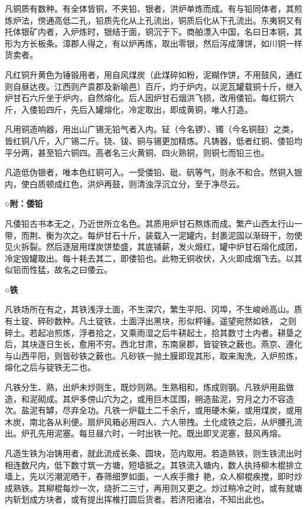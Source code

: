 \documentclass[]{article}
\begin{document}
凡铜质有数种。有全体皆铜，不夹铅、银者，洪炉单炼而成。有与铅同体者，其煎炼炉法，傍通高低二孔，铅质先化从上孔流出，铜质后化从下孔流出。东夷铜又有托体银矿内者，入炉炼时，银结于面，铜沉于下。商舶漂入中国，名曰日本铜，其形为方长板条。漳郡人得之，有以炉再炼，取出零银，然后泻成薄饼，如川铜一样货卖者。

凡红铜升黄色为锤锻用者，用自风煤炭（此煤碎如粉，泥糊作饼，不用鼓风，通红则自昼达夜。江西则产袁郡及新喻邑）百斤，灼于炉内，以泥瓦罐载铜十斤，继入炉甘石六斤坐于炉内，自然熔化。后人因炉甘石烟洪飞损，改用倭铅。每红铜六斤，入倭铅四斤，先后入罐熔化，冷定取出，即成黄铜，唯人打造。

凡用铜造响器，用出山广锡无铅气者入内。钲（今名锣）、镯（今名铜鼓）之类，皆红铜八斤，入广锡二斤。铙、钹、铜与锡更加精炼。凡铸器，低者红铜、倭铅均平分两，甚至铅六铜四。高者名三火黄铜、四火熟铜，则铜七而铅三也。

凡造低伪银者，唯本色红铜可入。一受倭铅、砒、矾等气，则永不和合。然铜入银内，使白质顿成红色，洪炉再鼓，则清浊浮沉立分，至于净尽云。

\textbf{○附：倭铅}

凡倭铅古书本无之，乃近世所立名色。其质用炉甘石熬炼而成。繁产山西太行山一带，而荆、衡为次之。每炉甘石十斤，装载入一泥罐内，封裹泥固以渐砑干，勿使见火拆裂。然后逐层用煤炭饼垫盛，其底铺薪，发火煅红，罐中炉甘石熔化成团，冷定毁罐取出。每十耗去其二，即倭铅也。此物无铜收伏，入火即成烟飞去。以其似铅而性猛，故名之曰倭云。

\textbf{○铁}

凡铁场所在有之，其铁浅浮土面，不生深穴，繁生平阳、冈埠，不生峻岭高山。质有土锭、碎砂数种。凡土锭铁，土面浮出黑块，形似枰锤。遥望宛然如铁，之则碎土。若起冶煎炼，浮者拾之，又乘雨湿之后牛耕起土，拾其数寸土内者。耕垦之后，其块逐日生长，愈用不穷。西北甘肃，东南泉郡，皆锭铁之薮也。燕京、遵化与山西平阳，则皆砂铁之薮也。凡砂铁一抛土膜即现其形，取来淘洗，入炉煎炼，熔化之后与锭铁无二也。

凡铁分生、熟，出炉未炒则生，既炒则熟。生熟相和，炼成则钢。凡铁炉用盐做造，和泥砌成。其炉多傍山穴为之，或用巨木匡围，朔造盐泥，穷月之力不容造次。盐泥有罅，尽弃全功。凡铁一炉载土二千余斤，或用硬木柴，或用煤炭，或用木炭，南北各从利便。扇炉风箱必用四人、六人带拽。土化成铁之后，从炉腰孔流出。炉孔先用泥塞。每旦昼六时，一时出铁一陀。既出即叉泥塞，鼓风再熔。

凡造生铁为冶铸用者，就此流成长条、圆块，范内取用。若造熟铁，则生铁流出时相连数尺内，低下数寸筑一方塘，短墙抵之。其铁流入塘内，数人执持柳木棍排立墙上，先以污潮泥晒干，舂筛细罗如面，一人疾手撒扌艳，众人柳棍疾搅，即时炒成熟铁。其柳棍每炒一次，烧折二三寸，再用则又更之。炒过稍冷之时，或有就塘内斩划成方块者，或有提出挥椎打圆后货者。若济阳诸冶，不知出此也。
\end{document}
